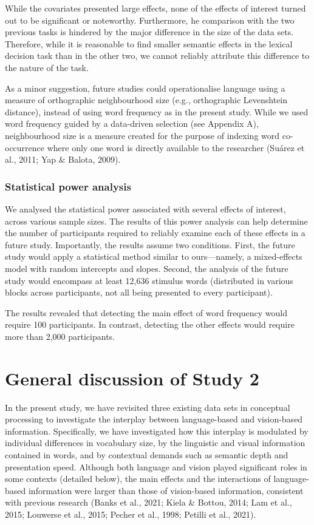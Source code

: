 \documentclass[
  12pt,
  man,floatsintext]{apa7}
\begin{document}
While the covariates presented large effects, none of the effects of interest turned out to be significant or noteworthy. Furthermore, he comparison with the two previous tasks is hindered by the major difference in the size of the data sets. Therefore, while it is reasonable to find smaller semantic effects in the lexical decision task than in the other two, we cannot reliably attribute this difference to the nature of the task.

As a minor suggestion, future studies could operationalise language using a measure of orthographic neighbourhood size (e.g., orthographic Levenshtein distance), instead of using word frequency as in the present study. While we used word frequency guided by a data-driven selection (see Appendix A), neighbourhood size is a measure created for the purpose of indexing word co-occurrence where only one word is directly available to the researcher (Suárez et al., 2011; Yap \& Balota, 2009).

\hypertarget{statistical-power-analysis-7}{%
\subsubsection{Statistical power analysis}\label{statistical-power-analysis-7}}

We analysed the statistical power associated with several effects of interest, across various sample sizes. The results of this power analysis can help determine the number of participants required to reliably examine each of these effects in a future study. Importantly, the results assume two conditions. First, the future study would apply a statistical method similar to ours---namely, a mixed-effects model with random intercepts and slopes. Second, the analysis of the future study would encompass at least 12,636 stimulus words (distributed in various blocks across participants, not all being presented to every participant).

The results revealed that detecting the main effect of word frequency would require 100 participants. In contrast, detecting the other effects would require more than 2,000 participants.

\hypertarget{general-discussion-of-study-2}{%
\section{General discussion of Study 2}\label{general-discussion-of-study-2}}

In the present study, we have revisited three existing data sets in conceptual processing to investigate the interplay between language-based and vision-based information. Specifically, we have investigated how this interplay is modulated by individual differences in vocabulary size, by the linguistic and visual information contained in words, and by contextual demands such as semantic depth and presentation speed. Although both language and vision played significant roles in some contexts (detailed below), the main effects and the interactions of language-based information were larger than those of vision-based information, consistent with previous research (Banks et al., 2021; Kiela \& Bottou, 2014; Lam et al., 2015; Louwerse et al., 2015; Pecher et al., 1998; Petilli et al., 2021).
\end{document}
